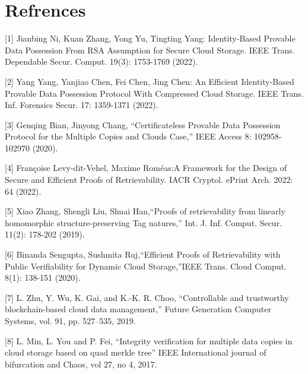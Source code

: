 \section{Refrences}
\large

[1] Jianbing Ni, Kuan Zhang, Yong Yu, Tingting Yang: Identity-Based Provable Data Possession From RSA Assumption for Secure Cloud Storage. IEEE Trans. Dependable Secur. Comput. 19(3): 1753-1769 (2022).

[2] Yang Yang, Yanjiao Chen, Fei Chen, Jing Chen: An Efficient Identity-Based Provable Data Possession Protocol With Compressed Cloud Storage. IEEE Trans. Inf. Forensics Secur. 17: 1359-1371 (2022).

[3] Genqing Bian, Jinyong Chang, “Certificateless Provable Data Possession Protocol for the Multiple Copies and Clouds Case,” IEEE Access 8: 102958-102970 (2020).

[4] Françoise Levy-dit-Vehel, Maxime Roméas:A Framework for the Design of Secure and Efficient Proofs of Retrievability. IACR Cryptol. ePrint Arch. 2022: 64 (2022).

[5] Xiao Zhang, Shengli Liu, Shuai Han,“Proofs of retrievability from linearly homomorphic structure-preserving Tag natures,” Int. J. Inf. Comput. Secur. 11(2): 178-202 (2019).

[6] Binanda Sengupta, Sushmita Ruj,“Efficient Proofs of Retrievability with Public Verifiability for Dynamic Cloud Storage,”IEEE Trans. Cloud Comput. 8(1): 138-151 (2020).

[7] L. Zhu, Y. Wu, K. Gai, and K.-K. R. Choo, “Controllable and trustworthy blockchain-based cloud data management,” Future Generation Computer Systems, vol. 91, pp. 527–535, 2019.

[8] L. Min, L. You and P. Fei, “Integrity verification for multiple data copies in cloud storage based on quad merkle tree” IEEE International journal of bifurcation and Chaos, vol 27, no 4, 2017.

